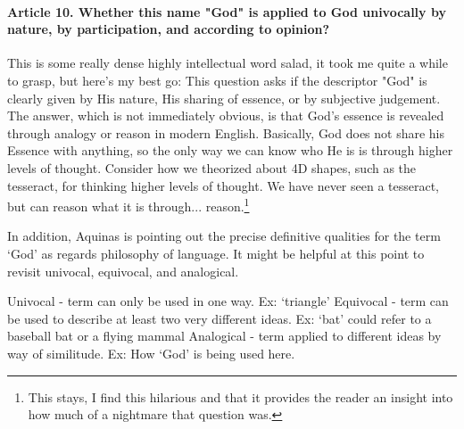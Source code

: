\documentclass{ucetd}
\begin{document}
\paragraph{Article 10. Whether this name "God" is applied to God univocally by nature, by participation, and according to opinion?}
This is some really dense highly intellectual word salad, it took me quite a while to grasp, but here's my best go:
This question asks if the descriptor "God" is clearly given by His nature, His sharing of essence, or by subjective judgement. The answer, which is not immediately obvious, is that God's essence is revealed through analogy or reason in modern English. Basically, God does not share his Essence with anything, so the only way we can know who He is is through higher levels of thought. Consider how we theorized about 4D shapes, such as the tesseract, for thinking higher levels of thought. We have never seen a tesseract, but can reason what it is through... reason.\footnote{This stays, I find this hilarious and that it provides the reader an insight into how much of a nightmare that question was.}

In addition, Aquinas is pointing out the precise definitive qualities for the term `God' as regards philosophy of language. It might be helpful at this point to revisit univocal, equivocal, and analogical.

Univocal - term can only be used in one way. Ex: `triangle'
Equivocal - term can be used to describe at least two very different ideas. Ex: `bat' could refer to a baseball bat or a flying mammal
Analogical - term applied to different ideas by way of similitude. Ex: How `God' is being used here.
\end{document}
